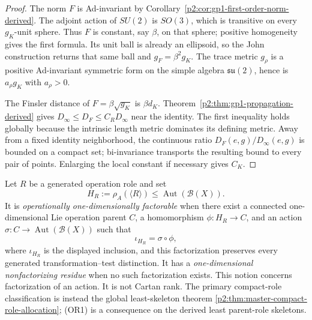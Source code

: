\documentclass[12pt,a4paper]{article}
\begin{document}
\begin{proof}
The norm \(F\) is Ad-invariant by
Corollary~\ref{p2:cor:gp1-first-order-norm-derived}.  The adjoint action of
\(SU(2)\) is \(SO(3)\), which is transitive on every \(g_K\)-unit sphere.
Thus \(F\) is constant, say \(\beta\), on that sphere; positive homogeneity
gives the first formula.  Its unit ball is already an ellipsoid, so the John
construction returns that same ball and \(g_F=\beta^2g_K\).  The trace metric
\(g_\rho\) is a positive Ad-invariant symmetric form on the simple algebra
\(\mathfrak{su}(2)\), hence is \(a_\rho g_K\) with \(a_\rho>0\).

The Finsler distance of \(F=\beta\sqrt{g_K}\) is \(\beta d_K\).
Theorem~\ref{p2:thm:gp1-propagation-derived} gives
\(D_\infty\le D_F\le C_RD_\infty\) near the identity.  The first inequality
holds globally because the intrinsic length metric dominates its defining
metric.  Away from a fixed identity neighborhood, the continuous ratio
\(D_F(e,g)/D_\infty(e,g)\) is bounded on a compact set; bi-invariance
transports the resulting bound to every pair of points.  Enlarging the local
constant if necessary gives \(C_K\).
\end{proof}

\begin{definition}
\label{p2:def:operational-rank-one-factorization}
Let \(R\) be a generated operation role and set
\[
 H_R:=\rho_A(\langle R\rangle)
 \leq\operatorname{Aut}(\mathcal B(X)).
\]
It is \emph{operationally one-dimensionally factorable} when
there exist a connected one-dimensional Lie operation parent \(C\), a
homomorphism \(\phi:H_R\to C\), and an action
\(\sigma:C\to\operatorname{Aut}(\mathcal B(X))\) such that
\[
 \iota_{H_R}=\sigma\circ\phi,
\]
where \(\iota_{H_R}\) is the displayed inclusion, and this factorization
preserves every generated transformation--test
distinction.  It has a \emph{one-dimensional nonfactorizing residue} when no
such factorization exists.  This notion concerns factorization of an action.
It is not Cartan rank.  The primary compact-role classification is instead
the global least-skeleton theorem
\ref{p2:thm:master-compact-role-allocation}; (OR1) is a consequence on the
derived least parent-role skeletons.
\end{definition}
\end{document}
